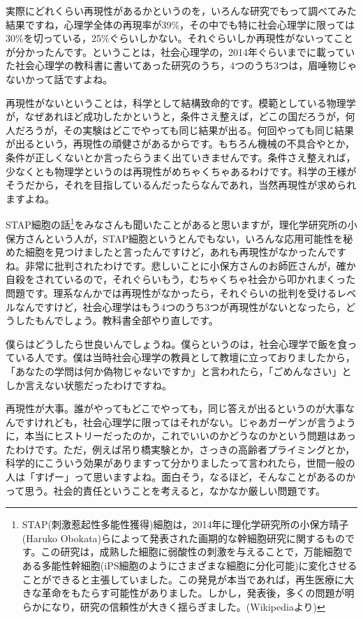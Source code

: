\documentclass{ltjsbook}
\begin{document}
実際にどれくらい再現性があるかというのを，いろんな研究でもって調べてみた結果ですね，心理学全体の再現率が39\%，その中でも特に社会心理学に限っては30\%を切っている，25\%ぐらいしかない。それぐらいしか再現性がないってことが分かったんです。ということは，社会心理学の，2014年ぐらいまでに載っていた社会心理学の教科書に書いてあった研究のうち，4つのうち3つは，眉唾物じゃないかって話ですよね。

再現性がないということは，科学として結構致命的です。模範としている物理学が，なぜあれほど成功したかというと，条件さえ整えば，どこの国だろうが，何人だろうが，その実験はどこでやっても同じ結果が出る。何回やっても同じ結果が出るという，再現性の頑健さがあるからです。もちろん機械の不具合やとか，条件が正しくないとか言ったらうまく出ていきませんです。条件さえ整えれば，少なくとも物理学というのは再現性がめちゃくちゃあるわけです。科学の王様がそうだから，それを目指しているんだったらなんであれ，当然再現性が求められますよね。

STAP細胞の話\footnote{STAP(刺激惹起性多能性獲得)細胞は，2014年に理化学研究所の小保方晴子(Haruko Obokata)らによって発表された画期的な幹細胞研究に関するものです。この研究は，成熟した細胞に弱酸性の刺激を与えることで，万能細胞である多能性幹細胞(iPS細胞のようにさまざまな細胞に分化可能)に変化させることができると主張していました。この発見が本当であれば，再生医療に大きな革命をもたらす可能性がありました。しかし，発表後，多くの問題が明らかになり，研究の信頼性が大きく揺らぎました。(Wikipediaより)}をみなさんも聞いたことがあると思いますが，理化学研究所の小保方さんという人が，STAP細胞というとんでもない，いろんな応用可能性を秘めた細胞を見つけましたと言ったんですけど，あれも再現性がなかったんですね。非常に批判されたわけです。悲しいことに小保方さんのお師匠さんが，確か自殺をされているので，それぐらいもう，むちゃくちゃ社会から叩かれまくった問題です。理系なんかでは再現性がなかったら，それぐらいの批判を受けるレベルなんですけど，社会心理学はもう4つのうち3つが再現性がないとなったら，どうしたもんでしょう。教科書全部やり直しです。

僕らはどうしたら世良いんでしょうね。僕らというのは，社会心理学で飯を食っている人です。僕は当時社会心理学の教員として教壇に立っておりましたから，「あなたの学問は何か偽物じゃないですか」と言われたら，「ごめんなさい」としか言えない状態だったわけですね。

再現性が大事。誰がやってもどこでやっても，同じ答えが出るというのが大事なんですけれども，社会心理学に限ってはそれがない。じゃあガーゲンが言うように，本当にヒストリーだったのか，これでいいのかどうなのかという問題はあったわけです。ただ，例えば吊り橋実験とか，さっきの高齢者プライミングとか，科学的にこういう効果がありますって分かりましたって言われたら，世間一般の人は「すげー」って思いますよね。面白そう，なるほど，そんなことがあるのかって思う。社会的責任ということを考えると，なかなか厳しい問題です。
\end{document}

